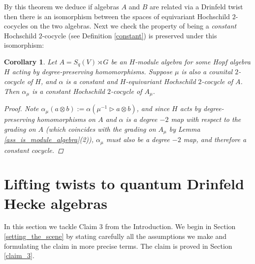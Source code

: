 \documentclass[10pt]{article}
\newcommand{\nt}{\noindent}
\newcommand{\al}{\alpha}
\newtheorem{cor}[lemma]{Corollary}
\theoremstyle{definition}
\begin{document}
\nt By this theorem we deduce if algebras $A$ and $B$ are related via a Drinfeld twist then there is an isomorphism between the spaces of equivariant Hochschild $2$-cocycles on the two algebras. Next we check the property of being a \textit{constant} Hochschild $2$-cocycle (see Definition \ref{constant}) is preserved under this isomorphism:

\begin{cor} Let $A=S_q(V)\rtimes G$ be an $H$-module algebra for some Hopf algebra $H$ acting by degree-preserving homomorphisms. Suppose $\mu$ is also a counital $2$-cocycle of $H$, and $\alpha$ is a constant and $H$-equivariant Hochschild $2$-cocycle of $A$. Then $\alpha_\mu$ is a constant Hochschild $2$-cocycle of $A_\mu$.
\begin{proof}
Note $\al_\mu(a\otimes b):=\al(\mu^{-1}\rhd a\otimes b)$, and since $H$ acts by degree-preserving homomorphisms on $A$ and $\alpha$ is a degree $-2$ map with respect to the grading on $A$ (which coincides with the grading on $A_\mu$ by Lemma \ref{ass_is_module_algebra}(2)), $\al_\mu$ must also be a degree $-2$ map, and therefore a constant cocycle.
\end{proof}
\end{cor}




\section{Lifting twists to quantum Drinfeld Hecke algebras}\label{claim_3_sec}
In this section we tackle Claim 3 from the Introduction. We begin in Section \ref{setting_the_scene} by stating carefully all the assumptions we make and formulating the claim in more precise terms. The claim is proved in Section \ref{claim_3}.
\end{document}

